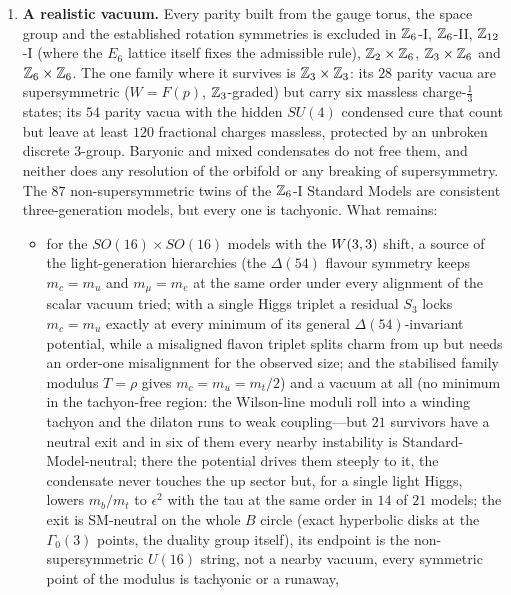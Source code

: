 \begin{enumerate}[label=\textbf{\arabic*.},leftmargin=1.6em,itemsep=5pt]
\item \textbf{A realistic vacuum.} Every parity built from the gauge torus, the space group and the
      established rotation symmetries is excluded in $\mathbb{Z}_6$-I, $\mathbb{Z}_6$-II, $\mathbb{Z}_{12}$-I (where the $E_6$
      lattice itself fixes the admissible rule), $\mathbb{Z}_2\times\mathbb{Z}_6$, $\mathbb{Z}_3\times\mathbb{Z}_6$ and $\mathbb{Z}_6\times\mathbb{Z}_6$.
      The one family where it survives is $\mathbb{Z}_3\times\mathbb{Z}_3$: its $28$ parity vacua are supersymmetric
      ($W=F(p)$, $\mathbb{Z}_3$-graded) but carry six massless charge-$\tfrac13$ states; its $54$ parity vacua
      with the hidden $SU(4)$ condensed cure that count but leave at least $120$ fractional charges
      massless, protected by an unbroken discrete $3$-group. Baryonic and mixed condensates do not free
      them, and neither does any resolution of the orbifold or any breaking of supersymmetry. The $87$
      non-supersymmetric twins of the $\mathbb{Z}_6$-I Standard Models are consistent three-generation models,
      but every one is tachyonic. What remains:
      \begin{itemize}
      \item for the $SO(16)\times SO(16)$ models with the $W(3,3)$ shift, a source of the light-generation
            hierarchies (the $\Delta(54)$ flavour symmetry keeps $m_c=m_u$ and $m_\mu=m_e$ at the same order under
            every alignment of the scalar vacuum tried; with a single Higgs triplet a residual $S_3$ locks $m_c=m_u$
            exactly at every minimum of its general $\Delta(54)$-invariant potential, while a misaligned flavon
            triplet splits charm from up but needs an order-one misalignment for the observed size; and the
            stabilised family modulus $T=\rho$ gives $m_c=m_u=m_t/2$) and a
            vacuum at all (no minimum in the tachyon-free region: the Wilson-line moduli roll into a winding
            tachyon and the dilaton runs to weak coupling---but $21$ survivors have a neutral exit and in six of them
            every nearby instability is Standard-Model-neutral; there the potential drives them steeply to it, the
            condensate never touches the up sector but, for a single light Higgs, lowers $m_b/m_t$ to $\epsilon^2$ with
            the tau at the same order in $14$ of $21$ models; the exit is SM-neutral on the whole $B$ circle (exact
            hyperbolic disks at the $\Gamma_0(3)$ points, the duality group itself), its endpoint is the
            non-supersymmetric $U(16)$ string, not a nearby vacuum, every symmetric point of the modulus is tachyonic or a runaway,

\end{itemize}
\end{enumerate}
